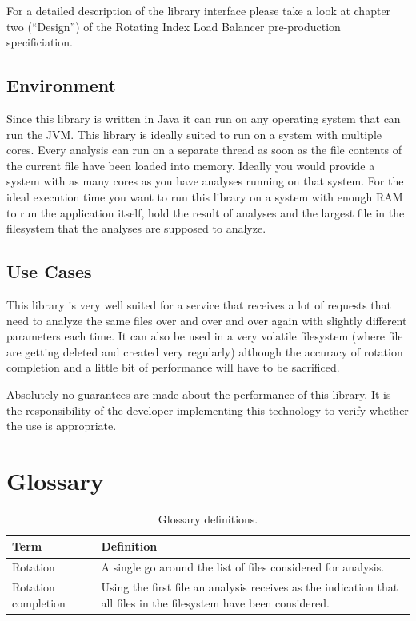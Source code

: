 \documentclass[11pt]{article} %
\newcommand{\rilb}{Rotating Index Load Balancer}
\begin{document}
  For a detailed description of the library interface please take a look at chapter two (``Design'') of the \rilb{} pre-production specificiation\hyperref[fn:pp-spec]{\footnotemark[1]}.


  \subsection{Environment}\label{sec:3.1}

  Since this library is written in Java it can run on any operating system that can run the JVM. This library is ideally suited to run on a system with multiple cores. Every analysis can run on a separate thread as soon as the file contents of the current file have been loaded into memory. Ideally you would provide a system with as many cores as you have analyses running on that system. For the ideal execution time you want to run this library on a system with enough RAM to run the application itself, hold the result of analyses and the largest file in the filesystem that the analyses are supposed to analyze.


  \subsection{Use Cases}\label{sec:3.2}

  This library is very well suited for a service that receives a lot of requests that need to analyze the same files over and over and over again with slightly different parameters each time. It can also be used in a very volatile filesystem (where file are getting deleted and created very regularly) although the accuracy of rotation completion and a little bit of performance will have to be sacrificed.

  Absolutely no guarantees are made about the performance of this library. It is the responsibility of the developer implementing this technology to verify whether the use is appropriate.



  \newpage



  \section{Glossary}

  \begin{table}[H]
    \centering
    \begin{tabular}{p{.3\linewidth} | p{.6\linewidth}}
      \textbf{Term} & \textbf{Definition}
      \\\hline
      Rotation            & A single go around the list of files considered for analysis.                                                      \\\hline
      Rotation completion & Using the first file an analysis receives as the indication that all files in the filesystem have been considered.
    \end{tabular}
    \caption{Glossary definitions.}
    \label{tab:glossary}
  \end{table}

  \printbibliography[heading=bibintoc]
  \listoffigures
  \listoftables
\end{document}
